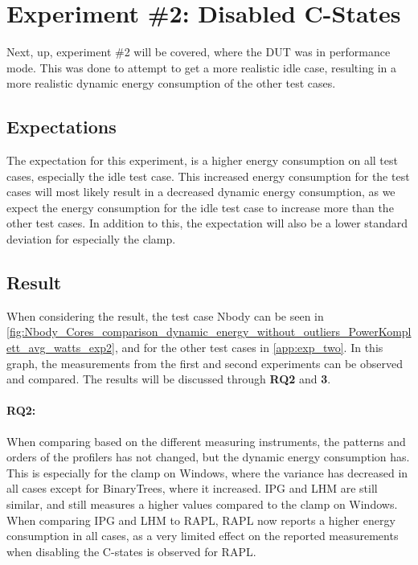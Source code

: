 \section{Experiment \#2: Disabled C-States}\label{sec:disable_c_states_exp}

Next, up, experiment \#2 will be covered, where the DUT was in performance mode. This was done to attempt to get a more realistic idle case, resulting in a more realistic dynamic energy consumption of the other test cases.

\subsection{Expectations} 

The expectation for this experiment, is a higher energy consumption on all test cases, especially the idle test case. This increased energy consumption for the test cases will most likely result in a decreased dynamic energy consumption, as we expect the energy consumption for the idle test case to increase more than the other test cases. In addition to this, the expectation will also be a lower standard deviation for especially the clamp.

\subsection{Result} 
When considering the result, the test case Nbody can be seen in \cref{fig:Nbody_Cores_comparison_dynamic_energy_without_outliers_PowerKomplett_avg_watts_exp2}, and for the other test cases in \cref{app:exp_two}. In this graph, the measurements from the first and second experiments can be observed and compared. The results will be discussed through \textbf{RQ2} and \textbf{3}.

\paragraph*{RQ2:} When comparing based on the different measuring instruments, the patterns and orders of the profilers has not changed, but the dynamic energy consumption has. This is especially for the clamp on Windows, where the variance has decreased in all cases except for BinaryTrees, where it increased. IPG and LHM are still similar, and still measures a higher values compared to the clamp on Windows. When comparing IPG and LHM to RAPL, RAPL now reports a higher energy consumption in all cases, as a very limited effect on the reported measurements when disabling the C-states is observed for RAPL.

